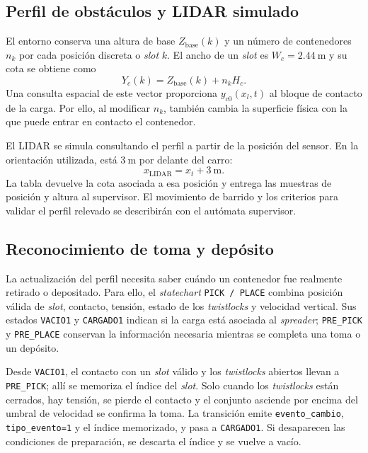\documentclass[a4paper,10pt,onecolumn,journal]{ieeeconf}
\numberwithin{equation}{section}
\begin{document}
	\subsection{Perfil de obstáculos y LIDAR simulado}
	\label{sec:entorno_planta}
	El entorno conserva una altura de base $Z_{\mathrm{base}}(k)$ y un número de contenedores $n_k$ por cada posición discreta o \textit{slot} $k$. El ancho de un \textit{slot} es $W_c=2.44~\mathrm{m}$ y su cota se obtiene como
	\begin{equation}
		Y_c(k)=Z_{\mathrm{base}}(k)+n_kH_c.
		\label{eq:perfil_slots}
	\end{equation}
	Una consulta espacial de este vector proporciona $y_{c0}(x_l,t)$ al bloque de contacto de la carga. Por ello, al modificar $n_k$, también cambia la superficie física con la que puede entrar en contacto el contenedor.
	
	El LIDAR se simula consultando el perfil a partir de la posición del sensor. En la orientación utilizada, está $3~\mathrm{m}$ por delante del carro:
	\begin{equation}
		x_{\mathrm{LIDAR}}=x_t+3~\mathrm{m}.
	\end{equation}
	La tabla devuelve la cota asociada a esa posición y entrega las muestras de posición y altura al supervisor. El movimiento de barrido y los criterios para validar el perfil relevado se describirán con el autómata supervisor.
	
	
	\subsection{Reconocimiento de toma y depósito}
	La actualización del perfil necesita saber cuándo un contenedor fue realmente retirado o depositado. Para ello, el \textit{statechart} \texttt{PICK / PLACE} combina posición válida de \textit{slot}, contacto, tensión, estado de los \textit{twistlocks} y velocidad vertical. Sus estados \texttt{VACIO1} y \texttt{CARGADO1} indican si la carga está asociada al \textit{spreader}; \texttt{PRE\_PICK} y \texttt{PRE\_PLACE} conservan la información necesaria mientras se completa una toma o un depósito.
	
	Desde \texttt{VACIO1}, el contacto con un \textit{slot} válido y los \textit{twistlocks} abiertos llevan a \texttt{PRE\_PICK}; allí se memoriza el índice del \textit{slot}. Solo cuando los \textit{twistlocks} están cerrados, hay tensión, se pierde el contacto y el conjunto asciende por encima del umbral de velocidad se confirma la toma. La transición emite \texttt{evento\_cambio}, \texttt{tipo\_evento=1} y el índice memorizado, y pasa a \texttt{CARGADO1}. Si desaparecen las condiciones de preparación, se descarta el índice y se vuelve a vacío.
	
\end{document}
